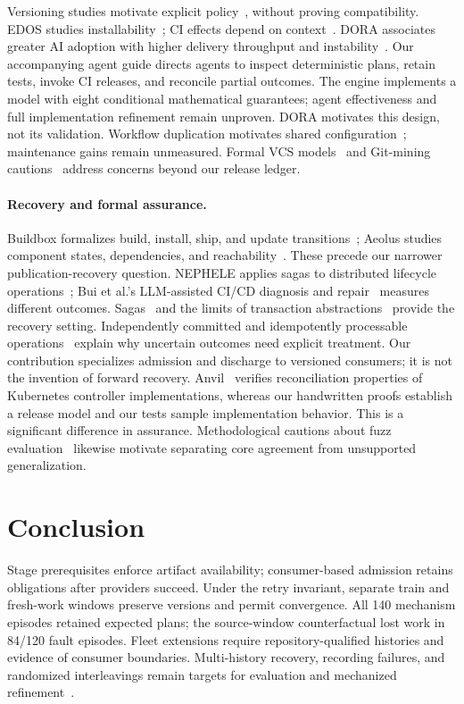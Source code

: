 Versioning studies motivate explicit policy~\cite{raemaekers,bogart,decan},
without proving compatibility. EDOS studies installability~\cite{edos};
CI effects depend on context~\cite{huangci}.
DORA associates greater AI adoption with higher delivery throughput and
instability~\cite{dora2025}. Our accompanying agent guide directs agents to
inspect deterministic plans, retain tests, invoke CI releases, and reconcile
partial outcomes. The engine implements a model with eight conditional
mathematical guarantees; agent effectiveness and full implementation refinement
remain unproven. DORA motivates this design, not its validation.
Workflow duplication motivates shared configuration~\cite{cardoen};
maintenance gains remain unmeasured. Formal VCS models~\cite{swierstraloh,hpt,mimram,mrdt}
and Git-mining cautions~\cite{birdgit} address concerns beyond our release ledger.

\paragraph{Recovery and formal assurance.}
Buildbox formalizes build, install, ship, and update transitions~\cite{liusmith};
Aeolus studies component states, dependencies, and reachability~\cite{aeolus}.
These precede our narrower publication-recovery question. NEPHELE applies
sagas to distributed lifecycle operations~\cite{nephele}; Bui et al.'s
LLM-assisted CI/CD diagnosis and repair~\cite{bui} measures different outcomes.
Sagas~\cite{sagas} and the limits of transaction abstractions~\cite{gray}
provide the recovery setting. Independently committed and idempotently
processable operations~\cite{helland07,helland12} explain why uncertain
outcomes need explicit treatment. Our contribution specializes admission and
discharge to versioned consumers; it is not the invention of forward recovery.
Anvil~\cite{anvil} verifies reconciliation properties of Kubernetes controller
implementations, whereas our handwritten proofs establish a release model and
our tests sample implementation behavior. This is a significant difference
in assurance. Methodological cautions about fuzz evaluation~\cite{klees}
likewise motivate separating core agreement from unsupported generalization.

\section{Conclusion}
\label{sec:conclusion}
Stage prerequisites enforce artifact availability; consumer-based admission
retains obligations after providers succeed. Under the retry invariant,
separate train and fresh-work windows preserve versions and permit convergence.
All 140 mechanism episodes retained expected plans; the source-window
counterfactual lost work in 84/120 fault episodes. Fleet extensions require
repository-qualified histories and evidence of consumer boundaries.
Multi-history recovery, recording failures, and randomized interleavings
remain targets for evaluation and mechanized refinement~\cite{lamport}.

